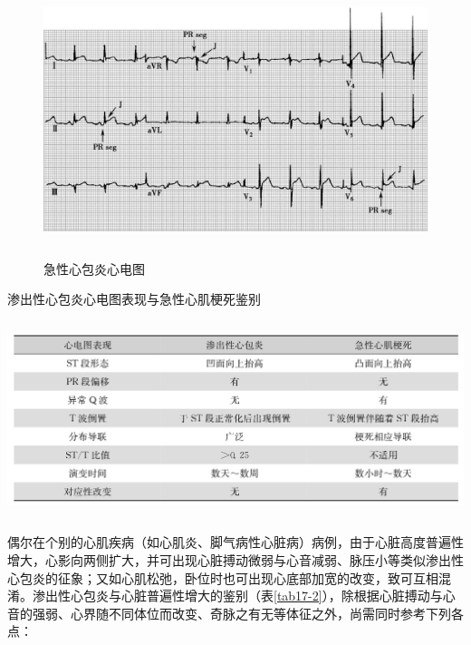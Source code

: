 \begin{figure}[!htbp]
 \centering
 \includegraphics[width=5.40625in,height=3.13542in]{./images/Image00103.jpg}
 \captionsetup{justification=centering}
 \caption{急性心包炎心电图}
 \label{fig17-1}
  \end{figure} 

\begin{table}[htbp]
\centering
\caption{渗出性心包炎心电图表现与急性心肌梗死鉴别}
\label{tab17-1}
\includegraphics[width=5.97917in,height=2.25in]{./images/Image00104.jpg}
\end{table}

偶尔在个别的心肌疾病（如心肌炎、脚气病性心脏病）病例，由于心脏高度普遍性增大，心影向两侧扩大，并可出现心脏搏动微弱与心音减弱、脉压小等类似渗出性心包炎的征象；又如心肌松弛，卧位时也可出现心底部加宽的改变，致可互相混淆。渗出性心包炎与心脏普遍性增大的鉴别（表\ref{tab17-2}），除根据心脏搏动与心音的强弱、心界随不同体位而改变、奇脉之有无等体征之外，尚需同时参考下列各点：


